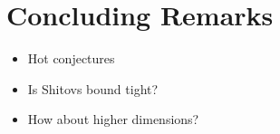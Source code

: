 \section{Concluding Remarks}

\begin{itemize}
  \item Hot conjectures
  \item Is Shitovs bound tight?
  \item How about higher dimensions?
\end{itemize}